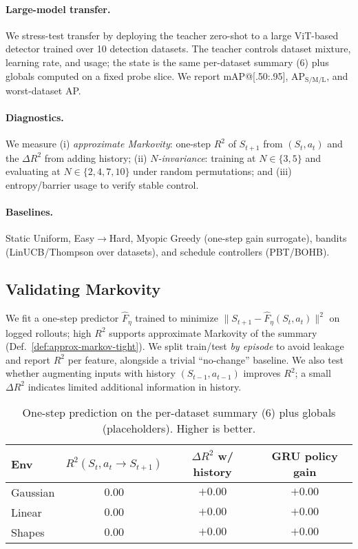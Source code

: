 \documentclass[11pt]{article}
\newcommand{\1}{\mathbf{1}}
\begin{document}
\paragraph{Large-model transfer.}
We stress-test transfer by deploying the teacher zero-shot to a large ViT-based detector trained over 10 detection datasets. 
The teacher controls dataset mixture, learning rate, and usage; the state is the same per-dataset summary (6) plus globals computed on a fixed probe slice. 
We report mAP@[.50:.95], AP$_\mathrm{S/M/L}$, and worst-dataset AP.

\paragraph{Diagnostics.}
We measure (i) \emph{approximate Markovity}: one-step $R^2$ of $S_{t+1}$ from $(S_t,a_t)$ and the $\Delta R^2$ from adding history; (ii) \emph{$N$-invariance}: training at $N\in\{3,5\}$ and evaluating at $N\in\{2,4,7,10\}$ under random permutations; and (iii) entropy/barrier usage to verify stable control.

\paragraph{Baselines.}
Static Uniform, Easy$\to$Hard, Myopic Greedy (one-step gain surrogate), bandits (LinUCB/Thompson over datasets), and schedule controllers (PBT/BOHB).

\subsection{Validating Markovity}\label{sec:markov-exp}
We fit a one-step predictor $\hat{F}_\eta$ trained to minimize $\|S_{t+1}-\hat{F}_\eta(S_t,a_t)\|^2$ on logged rollouts; high $R^2$ supports approximate Markovity of the summary (Def.~\ref{def:approx-markov-tight}).
We split train/test \emph{by episode} to avoid leakage and report $R^2$ per feature, alongside a trivial ``no-change'' baseline.
We also test whether augmenting inputs with history $(S_{t-1},a_{t-1})$ improves $R^2$; a small $\Delta R^2$ indicates limited additional information in history.
\begin{table}[H]
\centering
\caption{One-step prediction on the per-dataset summary (6) plus globals (placeholders). Higher is better.}
\label{tab:markov}
\begin{tabular}{lccc}
\toprule
Env & $R^2(S_t,a_t\!\to\!S_{t+1})$ & $\Delta R^2$ w/ history & GRU policy gain \\
\midrule
Gaussian & $0.00$ & $+0.00$ & $+0.00$ \\
Linear & $0.00$ & $+0.00$ & $+0.00$ \\
Shapes & $0.00$ & $+0.00$ & $+0.00$ \\
\bottomrule
\end{tabular}
\end{table}
\end{document}
